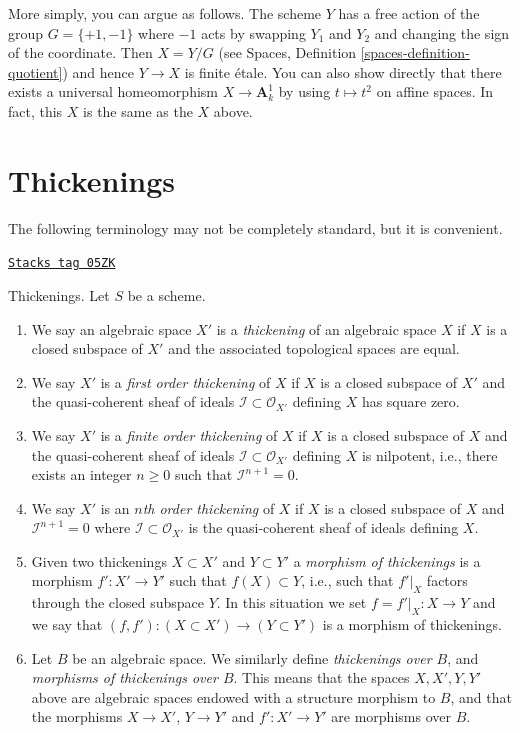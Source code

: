 \begin{remark}
\medskip\noindent
More simply, you can argue as follows. The scheme $Y$ has a free
action of the group $G = \{+1, -1\}$ where $-1$ acts by swapping
$Y_1$ and $Y_2$ and changing the sign of the coordinate. Then
$X = Y/G$ (see Spaces, Definition \ref{spaces-definition-quotient})
and hence $Y \to X$ is finite \'etale. You can also show directly
that there exists a universal homeomorphism $X \to \mathbf{A}^1_k$
by using $t \mapsto t^2$ on affine spaces. In fact, this $X$ is
the same as the $X$ above.
\end{remark}

\section{Thickenings}
\label{spaces-more-morphisms-section-thickenings}
The following terminology may not be completely standard, but it is convenient.

\begin{definition}[Thickening]
\label{spaces-more-morphisms-definition-thickening}
\href{https://stacks.math.columbia.edu/tag/05ZK}{\texttt{Stacks tag 05ZK}}

Thickenings. Let $S$ be a scheme.
\begin{enumerate}
\item We say an algebraic space $X'$ is a {\it thickening} of an algebraic
space $X$ if $X$ is a closed subspace of $X'$ and the associated topological
spaces are equal.
\item We say $X'$ is a {\it first order thickening} of $X$ if
$X$ is a closed subspace of $X'$ and the quasi-coherent sheaf of ideals
$\mathcal{I} \subset \mathcal{O}_{X'}$ defining $X$ has square zero.
\item We say $X'$ is a {\it finite order thickening} of $X$
if $X$ is a closed subspace of $X$ and the quasi-coherent sheaf of ideals
$\mathcal{I} \subset \mathcal{O}_{X'}$ defining $X$ is nilpotent, i.e.,
there exists an integer $n \geq 0$ such that $\mathcal{I}^{n + 1} = 0$.
\item We say $X'$ is an {\it $n$th order thickening} of $X$
if $X$ is a closed subspace of $X$ and $\mathcal{I}^{n + 1} = 0$
where $\mathcal{I} \subset \mathcal{O}_{X'}$ is the
quasi-coherent sheaf of ideals defining $X$.
\item Given two thickenings $X \subset X'$ and $Y \subset Y'$ a
{\it morphism of thickenings} is a morphism $f' : X' \to Y'$ such that
$f(X) \subset Y$, i.e., such that $f'|_X$ factors through the closed
subspace $Y$. In this situation we set $f = f'|_X : X \to Y$ and we say
that $(f, f') : (X \subset X') \to (Y \subset Y')$ is a morphism of
thickenings.
\item Let $B$ be an algebraic space. We similarly define
{\it thickenings over $B$}, and
{\it morphisms of thickenings over $B$}. This means that the spaces
$X, X', Y, Y'$ above are algebraic spaces endowed with a structure
morphism to $B$, and that the morphisms
$X \to X'$, $Y \to Y'$ and $f' : X' \to Y'$ are morphisms over $B$.
\end{enumerate}
\end{definition}

